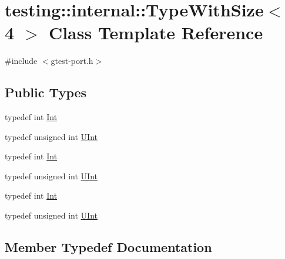 \hypertarget{classtesting_1_1internal_1_1_type_with_size_3_014_01_4}{}\section{testing\+::internal\+::Type\+With\+Size$<$ 4 $>$ Class Template Reference}
\label{classtesting_1_1internal_1_1_type_with_size_3_014_01_4}


{\ttfamily \#include $<$gtest-\/port.\+h$>$}

\subsection*{Public Types}
\begin{DoxyCompactItemize}
\item 
typedef int \mbox{\hyperlink{classtesting_1_1internal_1_1_type_with_size_3_014_01_4_a80351860c00ed665e73f952143f4484a}{Int}}
\item 
typedef unsigned int \mbox{\hyperlink{classtesting_1_1internal_1_1_type_with_size_3_014_01_4_a7d559570f830bf35d095eeb94d98de58}{U\+Int}}
\item 
typedef int \mbox{\hyperlink{classtesting_1_1internal_1_1_type_with_size_3_014_01_4_a80351860c00ed665e73f952143f4484a}{Int}}
\item 
typedef unsigned int \mbox{\hyperlink{classtesting_1_1internal_1_1_type_with_size_3_014_01_4_a7d559570f830bf35d095eeb94d98de58}{U\+Int}}
\item 
typedef int \mbox{\hyperlink{classtesting_1_1internal_1_1_type_with_size_3_014_01_4_a80351860c00ed665e73f952143f4484a}{Int}}
\item 
typedef unsigned int \mbox{\hyperlink{classtesting_1_1internal_1_1_type_with_size_3_014_01_4_a7d559570f830bf35d095eeb94d98de58}{U\+Int}}
\end{DoxyCompactItemize}


\subsection{Member Typedef Documentation}
\mbox{\label{classtesting_1_1internal_1_1_type_with_size_3_014_01_4_a80351860c00ed665e73f952143f4484a}} 
